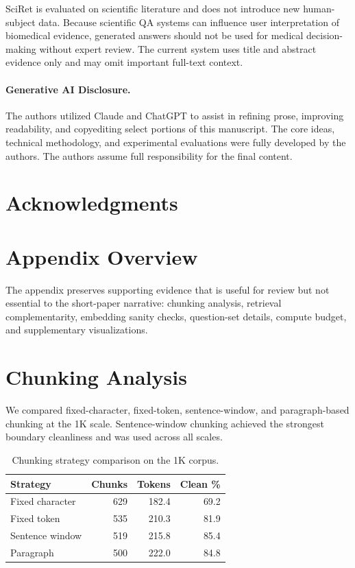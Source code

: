 \documentclass[11pt]{article}
\begin{document}
SciRet is evaluated on scientific literature and does not introduce new human-subject data. Because scientific QA systems can influence user interpretation of biomedical evidence, generated answers should not be used for medical decision-making without expert review. The current system uses title and abstract evidence only and may omit important full-text context.

\paragraph{Generative AI Disclosure.}
The authors utilized Claude and ChatGPT to assist in refining prose, improving readability, and copyediting select portions of this manuscript. The core ideas, technical methodology, and experimental evaluations were fully developed by the authors. The authors assume full responsibility for the final content.
\section*{Acknowledgments}




\appendix

\section{Appendix Overview}

The appendix preserves supporting evidence that is useful for review but not essential to the short-paper narrative: chunking analysis, retrieval complementarity, embedding sanity checks, question-set details, compute budget, and supplementary visualizations.

\section{Chunking Analysis}

We compared fixed-character, fixed-token, sentence-window, and paragraph-based chunking at the 1K scale. Sentence-window chunking achieved the strongest boundary cleanliness and was used across all scales.

\begin{table}[H]
\centering
\small
\caption{Chunking strategy comparison on the 1K corpus.}
\label{tab:chunking}
\begin{tabular}{lrrr}
\toprule
Strategy & Chunks & Tokens & Clean \% \\
\midrule
Fixed character & 629 & 182.4 & 69.2 \\
Fixed token & 535 & 210.3 & 81.9 \\
Sentence window & 519 & 215.8 & 85.4 \\
Paragraph & 500 & 222.0 & 84.8 \\
\bottomrule
\end{tabular}
\end{table}
\end{document}
